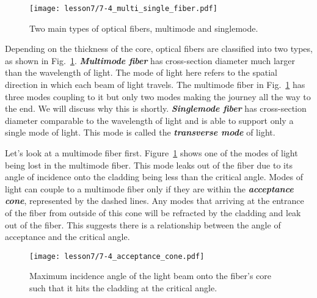\begin{figure}[t]
    \centering
    \texttt{[image: lesson7/7-4\_multi\_single\_fiber.pdf]}
    \caption[Multimode and singlemode fibers.]{Two main types of optical fibers, multimode and singlemode.}
    \label{fig:7-4_multimode_singlemode_fiber}
\end{figure}

Depending on the thickness of the core, optical fibers are classified into two types, as shown in Fig.~\ref{fig:7-4_multimode_singlemode_fiber}.
\textbf{\emph{Multimode fiber}} has cross-section diameter much larger than the wavelength of light.
The mode of light here refers to the spatial direction in which each beam of light travels.
The multimode fiber in Fig.~\ref{fig:7-4_multimode_singlemode_fiber} has three modes coupling to it but only two modes making the journey all the way to the end.
We will discuss why this is shortly.
\textbf{\emph{Singlemode fiber}}  has cross-section diameter comparable to the wavelength of light and is able to support only a single mode of light.
This mode is called the \textbf{\emph{transverse mode}} of light.

Let's look at a multimode fiber first.
Figure~\ref{fig:7-4_multimode_singlemode_fiber} shows one of the modes of light being lost in the multimode fiber.
This mode leaks out of the fiber due to its angle of incidence onto the cladding being less than the critical angle.
Modes of light can couple to a multimode fiber only if they are within the \textbf{\emph{acceptance cone}}, represented by the dashed lines.
Any modes that arriving at the entrance of the fiber from outside of this cone will be refracted by the cladding and leak out of the fiber.
This suggests there is a relationship between the angle of acceptance and the critical angle.

\begin{figure}[t]
    \centering
    \texttt{[image: lesson7/7-4\_acceptance\_cone.pdf]}
    \caption[Acceptance cone.]{Maximum incidence angle of the light beam onto the fiber's core such that it hits the cladding at the critical angle.}
    \label{fig:7-4_acceptance_cone}
\end{figure}

